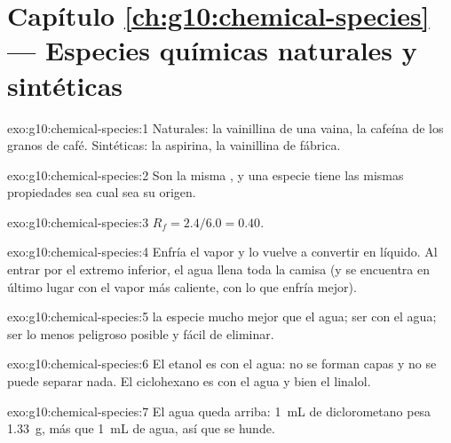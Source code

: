 \section*{Capítulo \ref{ch:g10:chemical-species} --- Especies químicas naturales y sintéticas}

\begin{solution}{exo:g10:chemical-species:1}
Naturales: la vainillina de una vaina, la cafeína de los granos de café.
Sintéticas: la aspirina, la vainillina de fábrica.
\end{solution}

\begin{solution}{exo:g10:chemical-species:2}
Son la misma , y una especie tiene las mismas propiedades
sea cual sea su origen.
\end{solution}

\begin{solution}{exo:g10:chemical-species:3}
$R_f = 2.4/6.0 = 0.40$.
\end{solution}

\begin{solution}{exo:g10:chemical-species:4}
Enfría el vapor y lo vuelve a convertir en líquido. Al entrar por el
extremo inferior, el agua llena toda la camisa (y se encuentra en último
lugar con el vapor más caliente, con lo que enfría mejor).
\end{solution}

\begin{solution}{exo:g10:chemical-species:5}
 la especie mucho mejor que el agua; ser  con el agua;
ser lo menos peligroso posible y fácil de eliminar.
\end{solution}

\begin{solution}{exo:g10:chemical-species:6}
El etanol es  con el agua: no se forman capas y no se puede
separar nada. El ciclohexano es  con el agua y  bien
el linalol.
\end{solution}

\begin{solution}{exo:g10:chemical-species:7}
El agua queda arriba: \qty{1}{mL} de diclorometano pesa \qty{1.33}{g},
más que \qty{1}{mL} de agua, así que se hunde.
\end{solution}

